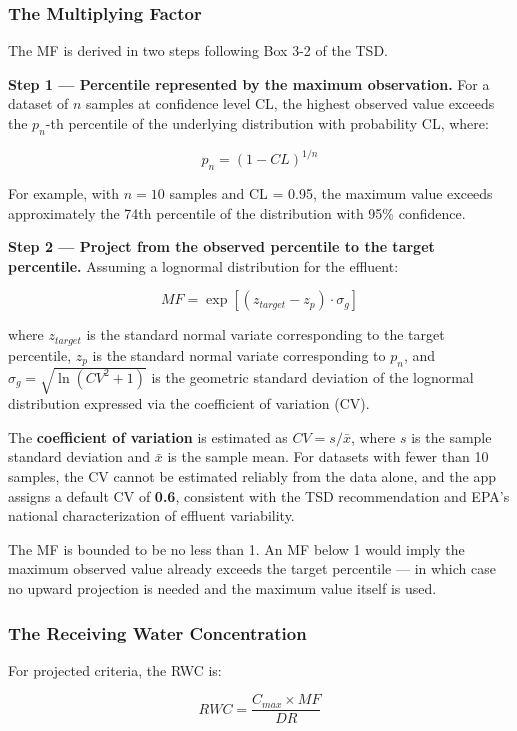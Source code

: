 \documentclass[
  11pt,
  letterpaper,
  DIV=11,
  numbers=noendperiod]{scrartcl}
\begin{document}
\subsubsection{The Multiplying Factor}\label{sec-mf}

The MF is derived in two steps following Box 3-2 of the TSD.

\textbf{Step 1 --- Percentile represented by the maximum observation.}
For a dataset of \(n\) samples at confidence level CL, the highest
observed value exceeds the \(p_n\)-th percentile of the underlying
distribution with probability CL, where:

\[p_n = (1 - CL)^{1/n}\]

For example, with \(n = 10\) samples and CL = 0.95, the maximum value
exceeds approximately the 74th percentile of the distribution with 95\%
confidence.

\textbf{Step 2 --- Project from the observed percentile to the target
percentile.} Assuming a lognormal distribution for the effluent:

\[MF = \exp\left[(z_{target} - z_p) \cdot \sigma_g\right]\]

where \(z_{target}\) is the standard normal variate corresponding to the
target percentile, \(z_p\) is the standard normal variate corresponding
to \(p_n\), and \(\sigma_g = \sqrt{\ln(CV^2 + 1)}\) is the geometric
standard deviation of the lognormal distribution expressed via the
coefficient of variation (CV).

The \textbf{coefficient of variation} is estimated as
\(CV = s / \bar{x}\), where \(s\) is the sample standard deviation and
\(\bar{x}\) is the sample mean. For datasets with fewer than 10 samples,
the CV cannot be estimated reliably from the data alone, and the app
assigns a default CV of \textbf{0.6}, consistent with the TSD
recommendation and EPA's national characterization of effluent
variability.

The MF is bounded to be no less than 1. An MF below 1 would imply the
maximum observed value already exceeds the target percentile --- in
which case no upward projection is needed and the maximum value itself
is used.

\subsubsection{The Receiving Water Concentration}\label{sec-rwc}

For projected criteria, the RWC is:

\[RWC = \frac{C_{max} \times MF}{DR}\]
\end{document}
